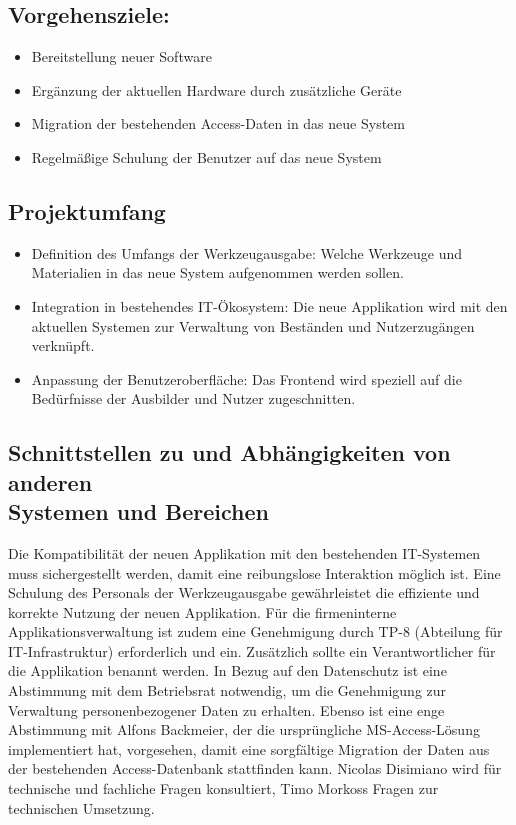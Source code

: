 \documentclass[a4paper, 12pt]{article}
\begin{document}
\subsection*{Vorgehensziele:}
\begin{itemize}[itemsep=0cm]
    \item Bereitstellung neuer Software
    \item Ergänzung der aktuellen Hardware durch zusätzliche Geräte
    \item Migration der bestehenden Access-Daten in das neue System
    \item Regelmäßige Schulung der Benutzer auf das neue System
\end{itemize}

\vspace{1cm}

\subsection{Projektumfang}
\begin{itemize}[itemsep=0cm]
    \item Definition des Umfangs der Werkzeugausgabe: Welche Werkzeuge und Materialien in das neue System aufgenommen werden sollen.
    \item Integration in bestehendes IT-Ökosystem: Die neue Applikation wird mit den aktuellen Systemen zur Verwaltung von Beständen und Nutzerzugängen verknüpft.
    \item Anpassung der Benutzeroberfläche: Das Frontend wird speziell auf die Bedürfnisse der Ausbilder und Nutzer zugeschnitten.
\end{itemize}

\vspace{1cm}

\subsection{Schnittstellen zu und Abhängigkeiten von anderen \\ Systemen und Bereichen}
Die Kompatibilität der neuen Applikation mit den bestehenden IT-Systemen muss sichergestellt werden, damit eine reibungslose Interaktion möglich ist. Eine Schulung des Personals der Werkzeugausgabe gewährleistet die effiziente und korrekte Nutzung der neuen Applikation. Für die firmeninterne Applikationsverwaltung ist zudem eine Genehmigung durch TP-8 (Abteilung für IT-Infrastruktur) erforderlich und ein. Zusätzlich sollte ein Verantwortlicher für die Applikation benannt werden. In Bezug auf den Datenschutz ist eine Abstimmung mit dem Betriebsrat notwendig, um die Genehmigung zur Verwaltung personenbezogener Daten zu erhalten. Ebenso ist eine enge Abstimmung mit Alfons Backmeier, der die ursprüngliche MS-Access-Lösung implementiert hat, vorgesehen, damit eine sorgfältige Migration der Daten aus der bestehenden Access-Datenbank stattfinden kann. Nicolas Disimiano wird für technische und fachliche Fragen konsultiert, Timo Morkoss Fragen zur technischen Umsetzung.
\end{document}
